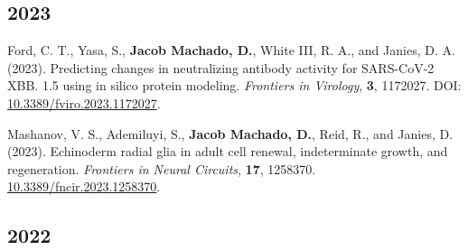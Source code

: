 \documentclass[11pt, letterpaper, sans]{moderncv}
\begin{document}

\subsection{2023}

	{\setlength{\parskip}{.5em}\renewcommand{\baselinestretch}{2.0}\begin{hangparas}{.25in}{1}

		Ford, C. T., Yasa, S., \textbf{Jacob Machado, D.}, White III, R. A., and Janies, D. A. (2023). Predicting changes in neutralizing antibody activity for SARS-CoV-2 XBB. 1.5 using in silico protein modeling. \textit{Frontiers in Virology}, \textbf{3}, 1172027. DOI: \href{https://doi.org/10.3389/fviro.2023.1172027}{10.3389/fviro.2023.1172027}.

		Mashanov, V. S., Ademiluyi, S., \textbf{Jacob Machado, D.}, Reid, R., and Janies, D. (2023). Echinoderm radial glia in adult cell renewal, indeterminate growth, and regeneration. \textit{Frontiers in Neural Circuits}, \textbf{17}, 1258370. \href{https://doi.org/10.3389/fncir.2023.1258370}{10.3389/fncir.2023.1258370}.

	\end{hangparas}}


\subsection{2022}
\end{document}
